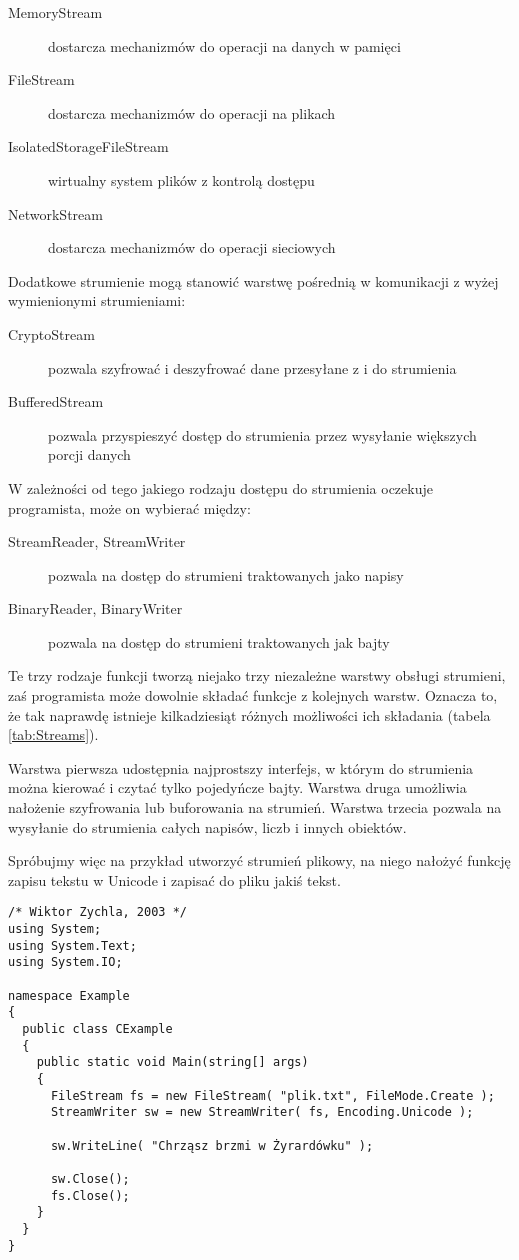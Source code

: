 \begin{description}
\item [MemoryStream] dostarcza mechanizmów do operacji na danych w pamięci
\item [FileStream] dostarcza mechanizmów do operacji na plikach
\item [IsolatedStorageFileStream] wirtualny system plików z kontrolą dostępu
\item [NetworkStream] dostarcza mechanizmów do operacji sieciowych
\end{description}

Dodatkowe strumienie mogą stanowić warstwę pośrednią w komunikacji z wyżej wymienionymi
strumieniami:

\begin{description}
\item [CryptoStream] pozwala szyfrować i deszyfrować dane przesyłane z i do strumienia
\item [BufferedStream] pozwala przyspieszyć dostęp do strumienia przez wysyłanie większych porcji danych
\end{description}

W zależności od tego jakiego rodzaju dostępu do strumienia oczekuje programista, może on wybierać między:

\begin{description}
\item [StreamReader, StreamWriter] pozwala na dostęp do strumieni traktowanych jako napisy
\item [BinaryReader, BinaryWriter] pozwala na dostęp do strumieni traktowanych jak bajty
\end{description}

Te trzy rodzaje funkcji tworzą niejako trzy niezależne warstwy obsługi strumieni, zaś
programista może dowolnie składać funkcje z kolejnych warstw. Oznacza to, że tak naprawdę
istnieje kilkadziesiąt różnych możliwości ich składania (tabela \ref{tab:Streams}).

Warstwa pierwsza udostępnia najprostszy interfejs, w którym do strumienia można kierować i czytać
tylko pojedyńcze bajty. Warstwa druga umożliwia nałożenie szyfrowania lub buforowania na strumień.
Warstwa trzecia pozwala na wysyłanie do strumienia całych napisów, liczb i innych obiektów.

Spróbujmy więc na przykład utworzyć strumień plikowy, na niego nałożyć funkcję zapisu tekstu
w Unicode i zapisać do pliku jakiś tekst. 

\begin{scriptsize}
\begin{verbatim}
/* Wiktor Zychla, 2003 */
using System;
using System.Text;
using System.IO;

namespace Example
{
  public class CExample 
  {
    public static void Main(string[] args)
    {
      FileStream fs = new FileStream( "plik.txt", FileMode.Create );
      StreamWriter sw = new StreamWriter( fs, Encoding.Unicode );

      sw.WriteLine( "Chrząsz brzmi w Żyrardówku" );
      
      sw.Close();
      fs.Close();
    }
  }
}
\end{verbatim}
\end{scriptsize}

